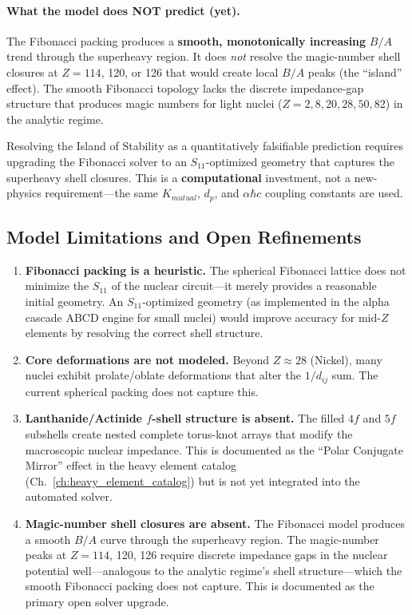\paragraph{What the model does NOT predict (yet).}
The Fibonacci packing produces a \textbf{smooth, monotonically increasing} $B/A$ trend through the superheavy region. It does \textit{not} resolve the magic-number shell closures at $Z = 114$, 120, or 126 that would create local $B/A$ peaks (the ``island'' effect). The smooth Fibonacci topology lacks the discrete impedance-gap structure that produces magic numbers for light nuclei ($Z = 2, 8, 20, 28, 50, 82$) in the analytic regime.

Resolving the Island of Stability as a quantitatively falsifiable prediction requires upgrading the Fibonacci solver to an $S_{11}$-optimized geometry that captures the superheavy shell closures. This is a \textbf{computational} investment, not a new-physics requirement---the same $K_{mutual}$, $d_p$, and $\alpha\hbar c$ coupling constants are used.

\subsection{Model Limitations and Open Refinements}

\begin{enumerate}
    \item \textbf{Fibonacci packing is a heuristic.} The spherical Fibonacci lattice does not minimize the $S_{11}$ of the nuclear circuit---it merely provides a reasonable initial geometry. An $S_{11}$-optimized geometry (as implemented in the alpha cascade ABCD engine for small nuclei) would improve accuracy for mid-$Z$ elements by resolving the correct shell structure.
    \item \textbf{Core deformations are not modeled.} Beyond $Z \approx 28$ (Nickel), many nuclei exhibit prolate/oblate deformations that alter the $1/d_{ij}$ sum. The current spherical packing does not capture this.
    \item \textbf{Lanthanide/Actinide $f$-shell structure is absent.} The filled $4f$ and $5f$ subshells create nested complete torus-knot arrays that modify the macroscopic nuclear impedance. This is documented as the ``Polar Conjugate Mirror'' effect in the heavy element catalog (Ch.~\ref{ch:heavy_element_catalog}) but is not yet integrated into the automated solver.
    \item \textbf{Magic-number shell closures are absent.} The Fibonacci model produces a smooth $B/A$ curve through the superheavy region. The magic-number peaks at $Z = 114$, 120, 126 require discrete impedance gaps in the nuclear potential well---analogous to the analytic regime's shell structure---which the smooth Fibonacci packing does not capture. This is documented as the primary open solver upgrade.
\end{enumerate}

